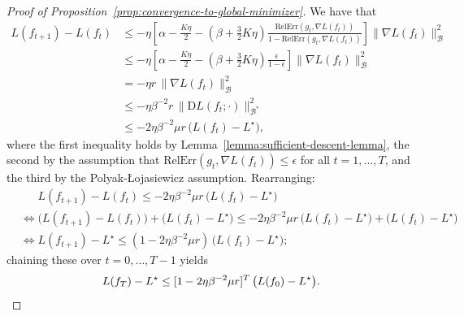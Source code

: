 \documentclass{article}
\newcommand{\B}{\mathcal{B}}
\newcommand{\D}{\mathrm{D}}
\newcommand{\RelErr}{\mathrm{RelErr}}
\begin{document}
\begin{proof}[Proof of Proposition~\ref{prop:convergence-to-global-minimizer}]
    We have that
    \begin{align*}
        L(f_{t+1}) - L(f_t)
        &\leq -\eta \left[ \alpha - \frac{K \eta}{2} - \left( \beta + \frac{3}{2} K \eta \right) \frac{\RelErr(g_t, \nabla L(f_t))}{1-\RelErr(g_t, \nabla L(f_t))} \right] \lVert \nabla L(f_t) \rVert_\B^2
        \\ &\leq -\eta \left[ \alpha - \frac{K \eta}{2} - \left( \beta + \frac{3}{2} K \eta \right) \frac{\epsilon}{1-\epsilon} \right] \lVert \nabla L(f_t) \rVert_\B^2
        \\ &= -\eta r \, \lVert \nabla L(f_t) \rVert_\B^2
        \\ &\leq -\eta \beta^{-2} r \, \lVert \D L(f_t; \cdot) \rVert_{\B^*}^2
        \\ &\leq -2 \eta \beta^{-2} \mu r \, \bigl( L(f_t) - L^\star \bigr),
    \end{align*}
    where the first inequality holds by Lemma~\ref{lemma:sufficient-descent-lemma}, the second by the assumption that $\RelErr(g_t, \nabla L(f_t)) \leq \epsilon$ for all $t = 1, \ldots, T$, and the third by the Polyak-Łojasiewicz assumption.
    Rearranging:
    \begin{align*}
        &\mathrel{\phantom{\iff}} L(f_{t+1}) - L(f_t) \leq -2 \eta \beta^{-2} \mu r \, \bigl( L(f_t) - L^\star \bigr)
        \\ &\iff \bigl( L(f_{t+1}) - L(f_t) \bigr) + \bigl( L(f_t) - L^\star \bigr) \leq -2 \eta \beta^{-2} \mu r \, \bigl( L(f_t) - L^\star \bigr) + \bigl( L(f_t) - L^\star \bigr)
        \\ &\iff L(f_{t+1}) - L^\star \leq (1 - 2 \eta \beta^{-2} \mu r) \, \bigl( L(f_t) - L^\star \bigr);
    \end{align*}
    chaining these over $t = 0, \ldots, T-1$ yields
    \[
        L(f_T) - L^\star
        \leq [1 - 2 \eta \beta^{-2} \mu r]^T \, \bigl( L(f_0) - L^\star \bigr). \qedhere
    \]
\end{proof}
\end{document}
